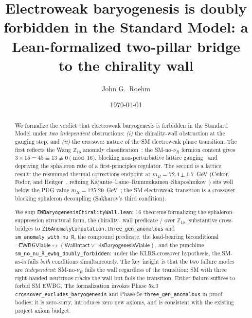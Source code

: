 \documentclass[aps,prl,twocolumn,showpacs,superscriptaddress,nofootinbib]{revtex4-2}
\newcommand{\WallIntact}{\mathsf{WallIntact}}
\newcommand{\WallCracked}{\mathsf{WallCracked}}
\newcommand{\EWBGViable}{\mathsf{EWBGViable}}
\newcommand{\Zsixteen}{\mathbb{Z}_{16}}
\begin{document}
\title{Electroweak baryogenesis is doubly forbidden in the Standard
Model: a Lean-formalized two-pillar bridge to the chirality wall}

\author{John G.\ Roehm}

\date{\today}

\begin{abstract}
We formalize the verdict that electroweak baryogenesis is forbidden in
the Standard Model under \emph{two independent} obstructions:
\textit{(i)} the chirality-wall obstruction at the gauging step, and
\textit{(ii)} the crossover nature of the SM electroweak phase
transition. The first reflects the Wang $\Zsixteen$ anomaly
classification~\cite{WangWanYou2022}: the SM-no-$\nu_R$ fermion content
gives $3 \times 15 = 45 \equiv 13 \not\equiv 0 \pmod{16}$, blocking
non-perturbative lattice gauging~\cite{Wang2020} and depriving the
sphaleron rate of a first-principles regulator. The second is a
lattice result: the resummed-thermal-corrections endpoint at
$m_H = 72.4 \pm 1.7$~GeV (Csikor, Fodor, and
Heitger~\cite{CsikorFodorHeitger1999}, refining
Kajantie--Laine--Rummukainen--Shaposhnikov~\cite{KLRS1996}) sits well
below the PDG value $m_H = 125.20$~GeV~\cite{PDG2024}; the SM
electroweak transition is a crossover, blocking sphaleron decoupling
(Sakharov's third condition).

We ship \texttt{EWBaryogenesisChiralityWall.lean}: $16$ theorems
formalizing the sphaleron-suppression structural form, the chirality-
wall predicate \WallIntact{} / \WallCracked{} over $\Zsixteen$,
substantive cross-bridges to
\texttt{Z16AnomalyComputation.three\_gen\_anomalous} and
\texttt{sm\_anomaly\_with\_nu\_R}, the compound \EWBGViable{}
predicate, the load-bearing biconditional
$\neg \EWBGViable{} \leftrightarrow (\WallIntact \vee \neg
\mathsf{IsBaryogenesisViable})$, and the punchline
\texttt{sm\_no\_nu\_R\_ewbg\_doubly\_forbidden}: under the
KLRS-crossover hypothesis, the SM-as-is fails \emph{both} conditions
simultaneously. The key insight is that the two failure modes are
\emph{independent}: SM-no-$\nu_R$ fails the wall regardless of the
transition; SM with three right-handed neutrinos cracks the wall but
fails the transition. Either failure suffices to forbid SM EWBG. The
formalization invokes Phase 5z.3
\texttt{crossover\_excludes\_baryogenesis} and Phase 5e
\texttt{three\_gen\_anomalous} in proof bodies; it is zero-sorry,
introduces zero new axioms, and is consistent with the existing
project axiom budget.
\end{abstract}
\end{document}

